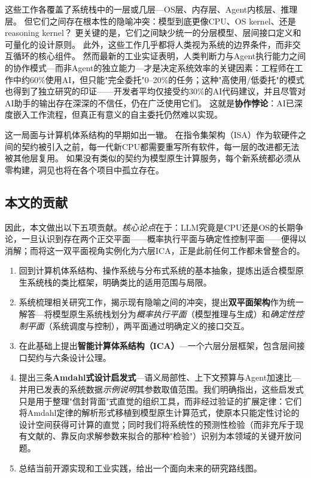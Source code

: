 这些工作各覆盖了系统栈中的一层或几层---OS层、内存层、Agent内核层、推理层。
但它们之间存在根本性的隐喻冲突：模型到底更像CPU、OS kernel、还是reasoning kernel？
更关键的是，它们之间缺少统一的分层模型、层间接口定义和可量化的设计原则。
此外，这些工作几乎都将人类视为系统的边界条件，而非交互循环的核心组件。
然而最新的工业实证表明，人类判断力与Agent执行能力之间的协作模式---而非Agent的独立能力---才是决定系统效率的关键因素：工程师在工作中约60\%使用AI，但只能"完全委托"0--20\%的任务\cite{anthropic2026agenticreport}；这种"高使用/低委托"的模式也得到了独立研究的印证——开发者平均仅接受约30\%的AI代码建议\cite{dohmke2023seachange}，并且尽管对AI助手的输出存在深深的不信任，仍在广泛使用它们\cite{klemmer2024aiassistants}。
这就是\textbf{协作悖论}：AI已深度嵌入工作流程，但真正有意义的自主委托仍然难以实现。

这一局面与计算机体系结构的早期如出一辙。
在指令集架构（ISA）作为软硬件之间的契约被引入之前，每一代新CPU都需要重写所有软件，每一层的改进都无法被其他层复用。
如果没有类似的契约为模型原生计算服务，每个新系统都必须从零构建，洞见也将在各个项目中孤立存在。

\subsection{本文的贡献}

因此，本文做出以下五项贡献。\emph{核心论点}在于：LLM究竟是CPU还是OS的长期争论，一旦认识到存在两个正交平面——概率执行平面与确定性控制平面——便得以消解；而将这一双平面视角实例化为六层ICA，正是此前任何工作都未曾整合的。

\begin{enumerate}
\item 回到计算机体系结构、操作系统与分布式系统的基本抽象，提炼出适合模型原生系统栈的类比框架，明确类比的适用范围与局限。

\item 系统梳理相关研究工作，揭示现有隐喻之间的冲突，提出\textbf{双平面架构}作为统一解答---将模型原生系统栈划分为\emph{概率执行平面}（模型推理与生成）和\emph{确定性控制平面}（系统调度与控制），两平面通过明确定义的接口交互。

\item 在此基础上提出\textbf{智能计算体系结构（ICA）}---一个六层分层框架，包含层间接口契约与六条设计公理。

\item 提出三条\textbf{Amdahl式设计启发式}---语义局部性、上下文预算与Agent加速比---并用已发表的系统数据\emph{示例说明}其参数取值范围。我们明确指出，这些启发式只是用于整理"信封背面"式直觉的组织工具，而非经过验证的扩展定律：它们将Amdahl定律的解析形式移植到模型原生计算范式，使原本只能定性讨论的设计空间获得可计算的直觉；同时我们将系统性的预测性检验（而非充斥于现有文献的、靠反向求解参数来拟合的那种"检验"）识别为本领域的关键开放问题。

\item 总结当前开源实现和工业实践，给出一个面向未来的研究路线图。
\end{enumerate}

